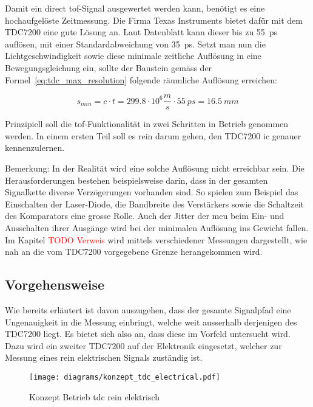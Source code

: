 Damit ein direct \acrshort{tof}-Signal ausgewertet werden kann, benötigt es eine hochaufgelöste
Zeitmessung. Die Firma Texas Instruments bietet dafür mit dem TDC7200 eine gute Lösung
an. Laut Datenblatt \cite{ti2016tdc7200_datasheet} kann dieser bis zu 55~ps auflösen, mit einer
Standardabweichung von 35~ps. Setzt man nun die Lichtgeschwindigkeit sowie diese minimale
zeitliche Auflösung in eine Bewegungsgleichung ein, sollte der Baustein gemäss der Formel~\ref{eq:tdc_max_resolution}
folgende räumliche Auflösung erreichen:

\begin{equation}\label{eq:tdc_max_resolution}
        s_{min} = c \cdot t = 299.8 \cdot 10^6 \frac{m}{s} \cdot 55~ps = 16.5~mm
\end{equation}

Prinzipiell soll die \acrshort{tof}-Funktionalität in zwei Schritten in Betrieb genommen werden.
In einem ersten Teil soll es rein darum gehen, den TDC7200 \acrshort{ic} genauer
kennenzulernen.

Bemerkung: In der Realität wird eine solche Auflösung nicht erreichbar sein. Die Herausforderungen
bestehen beispielsweise darin, dass in der gesamten Signalkette diverse Verzögerungen vorhanden sind.
So spielen zum Beispiel das Einschalten der Laser-Diode, die Bandbreite des Verstärkers sowie
die Schaltzeit des Komparators eine grosse Rolle. Auch der Jitter der \acrshort{mcu} beim Ein- und Ausschalten
ihrer Ausgänge wird bei der minimalen Auflösung ins Gewicht fallen. Im Kapitel \textcolor{red}{TODO Verweis}
wird mittels verschiedener Messungen dargestellt, wie nah an die vom TDC7200 vorgegebene Grenze herangekommen wird.

\subsection{Vorgehensweise}\label{sec:approach}

Wie bereits erläutert ist davon auszugehen, dass der gesamte Signalpfad eine Ungenauigkeit in die Messung einbringt,
welche weit ausserhalb derjenigen des TDC7200 liegt. Es bietet sich also an, dass diese im Vorfeld untersucht wird.
Dazu wird ein zweiter TDC7200 auf der Elektronik eingesetzt, welcher zur Messung eines rein elektrischen Signals
zuständig ist.

\begin{figure}[H]
    \centering
    \texttt{[image: diagrams/konzept\_tdc\_electrical.pdf]}
    \caption{Konzept Betrieb \acrshort{tdc} rein elektrisch}\label{fig:konzept_tdc_electrical}
\end{figure}


